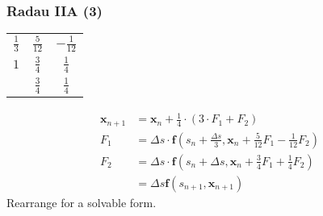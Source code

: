 \documentclass{article}
\begin{document}
\subsubsection{Radau IIA (3)}
\begin{center}
	\begin{tabular}{c|c c}
		$\frac{1}{3}$ & $\frac{5}{12}$ & $-\frac{1}{12}$ \\
		$1$           & $\frac{3}{4}$  & $\frac{1}{4}$   \\
		\hline
		              & $\frac{3}{4}$  & $\frac{1}{4}$
	\end{tabular}
\end{center}
\begin{align*}
	\bm{x}_{n+1} & = \bm{x}_n + \frac{1}{4}\cdot(3\cdot F_1 + F_2)                                                           \\
	F_1          & = \Delta s\cdot \bm{f}\left(s_n + \frac{\Delta s}{3}, \bm{x}_n + \frac{5}{12}F_1 - \frac{1}{12}F_2\right) \\
	F_2          & = \Delta s\cdot \bm{f}\left(s_n + \Delta s, \bm{x}_n + \frac{3}{4}F_1 + \frac{1}{4}F_2\right)             \\
	             & = \Delta s \bm{f}\left(s_{n+1}, \bm{x}_{n+1}\right)
\end{align*}
Rearrange for a solvable form.
\end{document}

